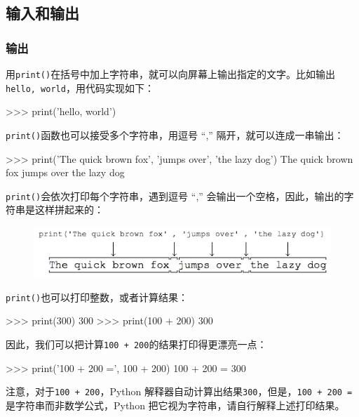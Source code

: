 \hypertarget{ux8f93ux5165ux548cux8f93ux51fa}{%
\subsection{输入和输出}\label{ux8f93ux5165ux548cux8f93ux51fa}}

\hypertarget{ux8f93ux51fa}{%
\subsubsection{输出}\label{ux8f93ux51fa}}

用\texttt{print()}在括号中加上字符串，就可以向屏幕上输出指定的文字。比如输出\texttt{\textquotesingle{}hello,\ world\textquotesingle{}}，用代码实现如下：

\begin{pythoncode}
>>> print('hello, world')
\end{pythoncode}

\texttt{print()}函数也可以接受多个字符串，用逗号 ``,''
隔开，就可以连成一串输出：

\begin{pythoncode}
>>> print('The quick brown fox', 'jumps over', 'the lazy dog')
The quick brown fox jumps over the lazy dog
\end{pythoncode}

\texttt{print()}会依次打印每个字符串，遇到逗号 ``,''
会输出一个空格，因此，输出的字符串是这样拼起来的：

 
 \begin{figure}[htp]
	\centering
	\includegraphics[width=0.6\linewidth]{fig/1017032122300544l.png}
\end{figure}


\texttt{print()}也可以打印整数，或者计算结果：

\begin{pythoncode}
>>> print(300)
300
>>> print(100 + 200)
300
\end{pythoncode}

因此，我们可以把计算\texttt{100\ +\ 200}的结果打印得更漂亮一点：

\begin{pythoncode}
>>> print('100 + 200 =', 100 + 200)
100 + 200 = 300
\end{pythoncode}

注意，对于\texttt{100\ +\ 200}，Python
解释器自动计算出结果\texttt{300}，但是，\texttt{\textquotesingle{}100\ +\ 200\ =\textquotesingle{}}是字符串而非数学公式，Python
把它视为字符串，请自行解释上述打印结果。

